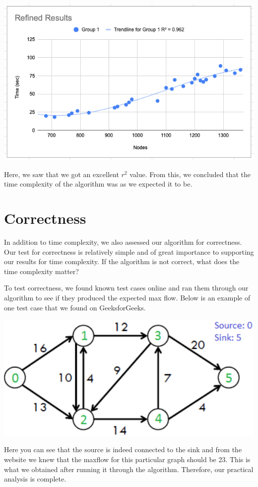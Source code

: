 \documentclass{report}
\begin{document}
\includegraphics[width=\textwidth]{assets/Josh2.png}

Here, we saw that we got an excellent $r^2$ value. From this, we concluded that the time complexity of the algorithm was as we expected it to be.

\section{Correctness}
In addition to time complexity, we also assessed our algorithm for correctness. Our test for correctness is relatively simple and of great importance to supporting our results for time complexity. If the algorithm is not correct, what does the time complexity matter?

To test correctness, we found known test cases online and ran them through our algorithm to see if they produced the expected max flow. Below is an example of one test case that we found on GeeksforGeeks.

\includegraphics[width=\textwidth]{assets/Josh3.png}

Here you can see that the source is indeed connected to the sink and from the website we knew that the maxflow for this particular graph should be 23. This is what we obtained after running it through the algorithm. Therefore, our practical analysis is complete.
\end{document}
